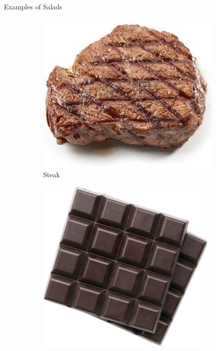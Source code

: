 \documentclass{beamer}
\begin{document}
\begin{frame}{Examples of Salads}
    \begin{figure}
        \begin{subfigure}{.3\textwidth}
          \centering
          \includegraphics[width=.8\linewidth]{images/cube_rule_of_food/salad/30_steak.jpg}
          \caption{\label{fig:steak}Steak}
        \end{subfigure}
        \begin{subfigure}{.35\textwidth}
          \centering
          \includegraphics[width=.8\linewidth]{images/cube_rule_of_food/salad/31_chocolate.png}

\end{subfigure}
\end{figure}
\end{frame}
\end{document}
